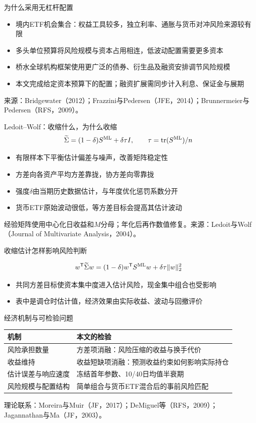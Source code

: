 \documentclass[aspectratio=169,11pt]{beamer}
\begin{document}
\begin{frame}{为什么采用无杠杆配置}
\begin{itemize}
\item 境内ETF机会集合：权益工具较多，独立利率、通胀与货币对冲风险来源较有限
\item 多头单位预算将风险规模与资本占用相连，低波动配置需要更多资本
\item 桥水全球机构框架使用更广泛的债券、衍生品及融资安排调节风险规模
\item 本文完成给定资本预算下的配置；融资扩展需同步计入利息、保证金与展期
\end{itemize}
\medskip\scriptsize 来源：Bridgewater（2012）；Frazzini与Pedersen（JFE，2014）；Brunnermeier与Pedersen（RFS，2009）。
\end{frame}
\begin{frame}{Ledoit--Wolf：收缩什么，为什么收缩}
\[
\widetilde\Sigma=(1-\delta)S^{\rm ML}+\delta\tau I,\qquad
\tau=\operatorname{tr}(S^{\rm ML})/n
\]
\begin{itemize}
\item 有限样本下平衡估计偏差与噪声，改善矩阵稳定性
\item 方差向各资产平均方差靠拢，协方差向零靠拢
\item 强度$\delta$由当期历史数据估计，与年度优化惩罚系数分开
\item 货币ETF原始波动很低，等方差目标会提高其估计波动
\end{itemize}
\scriptsize 经验矩阵使用中心化日收益和$M$分母；年化后再作数值修复。来源：Ledoit与Wolf（Journal of Multivariate Analysis，2004）。
\end{frame}
\begin{frame}{收缩估计怎样影响风险判断}
\centering
\resizebox{0.90\textwidth}{!}{}
\par\medskip
\[
w^\mathsf T\widetilde\Sigma w=(1-\delta)w^\mathsf T S^{\rm ML}w+\delta\tau\|w\|_2^2
\]
\begin{itemize}
\item 共同方差目标使资本集中度进入估计风险，现金集中组合也受影响
\item 表中是调仓时估计值，经济效果由实际收益、波动与回撤评价
\end{itemize}
\end{frame}
\begin{frame}{经济机制与可检验问题}
\begin{tabular}{p{}p{}}\toprule
机制 & 本文的检验\\\midrule
风险承担数量 & 方差项消融：风险压缩的收益与换手代价\\
收益维持 & 收益短缺项消融：预测收益约束如何影响实际持仓\\
估计误差与响应速度 & 冻结首年参数、10/40日均值半衰期\\
风险规模与配置结构 & 简单组合与货币ETF混合后的事前风险匹配\\\bottomrule
\end{tabular}
\medskip\scriptsize 理论联系：Moreira与Muir（JF，2017）；DeMiguel等（RFS，2009）；Jagannathan与Ma（JF，2003）。
\end{frame}
\end{document}
